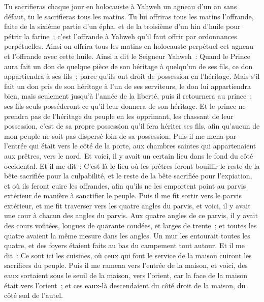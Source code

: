 \begin{multicols}{2}
Tu sacrifieras chaque jour en holocauste à Yahweh un agneau d'un an sans défaut, tu le sacrifieras tous les matins.
Tu lui offriras tous les matins l'offrande, faite de la sixième partie d'un épha, et de la troisième d'un hin d'huile pour pétrir la farine~; c'est l'offrande à Yahweh qu'il faut offrir par ordonnances perpétuelles.
Ainsi on offrira tous les matins en holocauste perpétuel cet agneau et l'offrande avec cette huile.
Ainsi a dit le Seigneur Yahweh~: Quand le Prince aura fait un don de quelque pièce de son héritage à quelqu'un de ses fils, ce don appartiendra à ses fils~; parce qu'ils ont droit de possession en l'héritage.
Mais s'il fait un don pris de son héritage à l'un de ses serviteurs, le don lui appartiendra bien, mais seulement jusqu'à l'année de la liberté, puis il retournera au prince~; ses fils seuls posséderont ce qu'il leur donnera de son héritage.
Et le prince ne prendra pas de l'héritage du peuple en les opprimant, les chassant de leur possession, c'est de sa propre possession qu'il fera hériter ses fils, afin qu'aucun de mon peuple ne soit pas dispersé loin de sa possession.
Puis il me mena par l'entrée qui était vers le côté de la porte, aux chambres saintes qui appartenaient aux prêtres, vers le nord. Et voici, il y avait un certain lieu dans le fond du côté occidental.
Et il me dit~: C'est là le lieu où les prêtres feront bouillir le reste de la bête sacrifiée pour la culpabilité, et le reste de la bête sacrifiée pour l'expiation, et où ils feront cuire les offrandes, afin qu'ils ne les emportent point au parvis extérieur de manière à sanctifier le peuple.
Puis il me fit sortir vers le parvis extérieur, et me fit traverser vers les quatre angles du parvis, et voici, il y avait une cour à chacun des angles du parvis.
Aux quatre angles de ce parvis, il y avait des cours voûtées, longues de quarante coudées, et larges de trente~; et toutes les quatre avaient la même mesure dans les angles.
Un mur les entourait toutes les quatre, et des foyers étaient faits au bas du campement tout autour.
Et il me dit~: Ce sont ici les cuisines, où ceux qui font le service de la maison cuiront les sacrifices du peuple.
\VerseOne{}Puis il me ramena vers l'entrée de la maison, et voici, des eaux sortaient sous le seuil de la maison, vers l'orient, car la face de la maison était vers l'orient~; et ces eaux-là descendaient du côté droit de la maison, du côté sud de l'autel.

\end{multicols}
